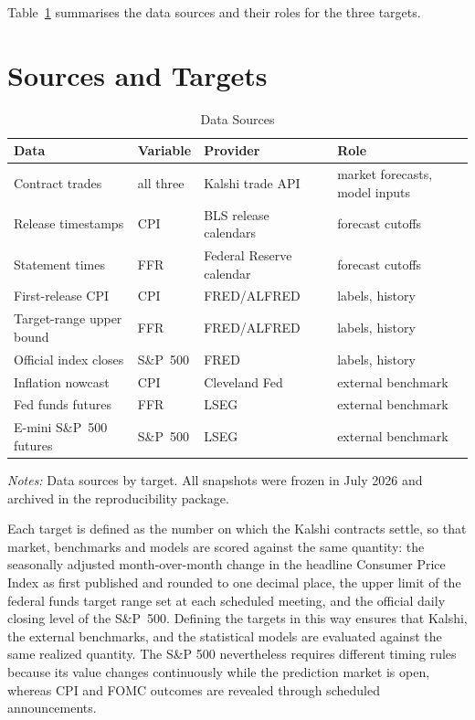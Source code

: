 \documentclass[12pt,a4paper]{report}
\newcommand{\tablenote}[1]{%
  \par\vspace{0.4em}%
  \begin{minipage}{0.9\textwidth}%
  \footnotesize\raggedright\emph{Notes:} #1%
  \end{minipage}%
}
\begin{document}
Table~\ref{tab:data-sources} summarises the data sources and their roles for
the three targets.

\section{Sources and Targets}
\label{sec:data-sources}

\begin{table}[htbp]
\centering
\caption{Data Sources}
\label{tab:data-sources}
\small
\begin{tabular}{@{}llp{2.9cm}p{3.9cm}@{}}
\toprule
Data & Variable & Provider & Role \\
\midrule
Contract trades & all three & Kalshi trade API & market forecasts, model inputs \\
Release timestamps & CPI & BLS release calendars & forecast cutoffs \\
Statement times & FFR & Federal Reserve calendar & forecast cutoffs \\
First-release CPI & CPI & FRED/ALFRED & labels, history \\
Target-range upper bound & FFR & FRED/ALFRED & labels, history \\
Official index closes & S\&P~500 & FRED & labels, history \\
Inflation nowcast & CPI & Cleveland Fed & external benchmark \\
Fed funds futures & FFR & LSEG & external benchmark \\
E-mini S\&P~500 futures & S\&P~500 & LSEG & external benchmark \\
\bottomrule
\end{tabular}
\tablenote{Data sources by target. All snapshots were frozen in July 2026 and
archived in the reproducibility package.}
\end{table}

Each target is defined as the number on which the Kalshi contracts settle, so
that market, benchmarks and models are scored against the same quantity: the
seasonally adjusted month-over-month change in the headline Consumer Price
Index as first published and rounded to one decimal place, the upper limit of
the federal funds target range set at each scheduled meeting, and the official
daily closing level of the S\&P~500. Defining the targets in this way ensures that Kalshi, the external benchmarks, and the statistical models are evaluated against the same realized quantity. The S\&P 500 nevertheless requires different timing rules because its value changes continuously while the prediction market is open, whereas CPI and FOMC outcomes are revealed through scheduled announcements.
\end{document}
